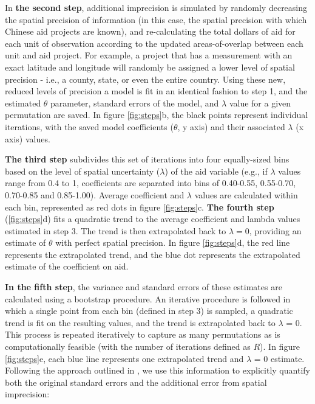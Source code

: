 \par 
In \textbf{the second step}, additional imprecision is simulated by randomly decreasing the spatial precision of information (in this case, the spatial precision with which Chinese aid projects are known), and re-calculating the total dollars of aid for each unit of observation according to the updated areas-of-overlap between each unit and aid project. 
For example, a project that has a measurement with an exact latitude and longitude will randomly be assigned a lower level of spatial precision - i.e., a county, state, or even the entire country. 
Using these new, reduced levels of precision a model is fit in an identical fashion to step 1, and the estimated $\theta$ parameter, standard errors of the model, and $\lambda$ value for a given permutation are saved.
In figure \ref{fig:steps}b, the black points represent individual iterations, with the saved model coefficients ($\theta$, y axis) and their associated $\lambda$ (x axis) values. 
\par
\textbf{The third step} subdivides this set of iterations into four equally-sized bins based on the level of spatial uncertainty ($\lambda$) of the aid variable (e.g., if $\lambda$ values range from 0.4 to 1, coefficients are separated into bins of 0.40-0.55, 0.55-0.70, 0.70-0.85 and 0.85-1.00). 
Average coefficient and $\lambda$ values are calculated within each bin, represented as red dots in figure \ref{fig:steps}c. 
\textbf{The fourth step} (\ref{fig:steps}d) fits a quadratic trend to the average coefficient and lambda values estimated in step 3.  
The trend is then extrapolated back to $\lambda=0$, providing an estimate of $\theta$ with perfect spatial precision. 
In figure \ref{fig:steps}d, the red line represents the extrapolated trend, and the blue dot represents the extrapolated estimate of the coefficient on aid. 
\par 

\textbf{In the fifth step}, the variance and standard errors of these estimates are calculated using a bootstrap procedure. 
An iterative procedure is followed in which a single point from each bin (defined in step 3) is sampled, a quadratic trend is fit on the resulting values, and the trend is extrapolated back to $\lambda$ = 0. 
This process is repeated iteratively to capture as many permutations as is computationally feasible (with the number of iterations defined as $R$). 
In figure \ref{fig:steps}e, each blue line represents one extrapolated trend and $\lambda$ = 0 estimate. 
Following the approach outlined in \cite{burnham_information_2002}, we use this information to explicitly quantify both the original standard errors and the additional error from spatial imprecision:

